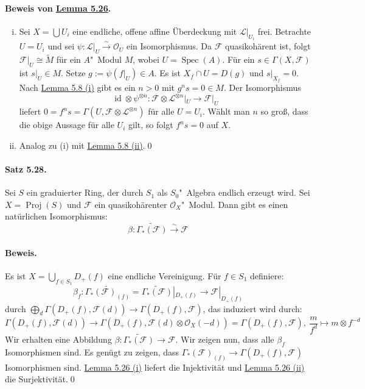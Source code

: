 \paragraph{Beweis von \hyperref[5.26]{Lemma 5.26}.} \begin{enumerate}[(i)]
\item Sei $X=\bigcup U_i$ eine endliche, offene affine Überdeckung mit $\mathcal{L}|_{U_i}$ frei. Betrachte $U=U_i$ und sei $\psi:\mathcal{L}|_U\stackrel{\sim}{\to}\mathcal{O}_U$ ein Isomorphismus. Da $\mathcal{F}$ quasikohärent ist, folgt $\mathcal{F}|_U\cong\widetilde{M}$ für ein $A$"~Modul $M$, wobei $U=\operatorname{Spec}(A)$. Für ein $s\in\Gamma(X,\mathcal{F})$ ist $s|_U\in M$. Setze $g:=\psi(f|_U)\in A$. Es ist $X_f\cap U=D(g)$ und $s|_{X_f}=0$. Nach \hyperref[5.8]{Lemma 5.8 (i)} gibt es ein $n>0$ mit $g^ns=0\in M$. Der Isomorphismus
\[\operatorname{id}\otimes \psi^{\otimes n}:\mathcal{F}\otimes \mathcal{L}^{\otimes n}|_U\to\mathcal{F}|_U \]
liefert $0=f^ns=\Gamma(U, \mathcal{F}\otimes\mathcal{L}^{\otimes n})$ für alle $U=U_i$. Wählt man $n$ so groß, dass die obige Aussage für alle $U_i$ gilt, so folgt $f^ns=0$ auf $X$.
\item Analog zu (i) mit \hyperref[5.8]{Lemma 5.8 (ii)}.\qed
\end{enumerate}

\paragraph{Satz 5.28.}\label{5.28} Sei $S$ ein graduierter Ring, der durch $S_1$ als $S_0$"~Algebra endlich erzeugt wird. Sei $X=\operatorname{Proj}(S)$ und $\mathcal{F}$ ein quasikohärenter $\mathcal{O}_X$"~Modul. Dann gibt es einen natürlichen Isomorphismus:
\[\beta:\widetilde{\Gamma_\ast(\mathcal{F})}\stackrel{\sim}{\to}\mathcal{F} \]

\paragraph{Beweis.} Es ist $X=\bigcup_{f\in S_1}D_+(f)$ eine endliche Vereinigung. Für $f\in S_1$ definiere:
\[\beta_f:\widetilde{\Gamma_\ast(\mathcal{F})_{(f)}}=\widetilde{\Gamma_\ast(\mathcal{F})}|_{D_+(f)}\to\mathcal{F}|_{D_+(f)} \]
durch $\bigoplus_d\Gamma(D_+(f),\mathcal{F}(d))\to\Gamma(D_+(f),\mathcal{F})$, das induziert wird durch:
\[\Gamma(D_+(f),\mathcal{F}(d))\to\Gamma(D_+(f),\mathcal{F}(d)\otimes \mathcal{O}_X(-d))= \Gamma(D_+(f),\mathcal{F}),\ \frac{m}{f^d}\mapsto m\otimes f^{-d} \]
Wir erhalten eine Abbildung $\beta:\widetilde{\Gamma_\ast(\mathcal{F})}\to\mathcal{F}$. Wir zeigen nun, dass alle $\beta_f$ Isomorphismen sind. Es genügt zu zeigen, dass $\Gamma_\ast(\mathcal{F})_{(f)}\to\Gamma(D_+(f),\mathcal{F})$ Isomorphismen sind. \hyperref[5.26]{Lemma 5.26 (i)} liefert die Injektivität und \hyperref[5.26]{Lemma 5.26 (ii)} die Surjektivität.\qed


